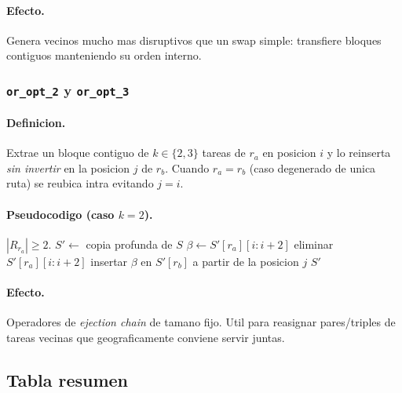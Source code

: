 \documentclass[11pt,a4paper]{article}
\newcommand{\op}[1]{\texttt{#1}}
\begin{document}
\paragraph{Efecto.} Genera vecinos mucho mas disruptivos que un swap
simple: transfiere bloques contiguos manteniendo su orden interno.

\subsubsection{\op{or\_opt\_2} y \op{or\_opt\_3}}

\paragraph{Definicion.} Extrae un bloque contiguo de $k\in\{2,3\}$
tareas de $r_a$ en posicion $i$ y lo reinserta \emph{sin invertir} en
la posicion $j$ de $r_b$. Cuando $r_a=r_b$ (caso degenerado de unica
ruta) se reubica intra evitando $j=i$.

\paragraph{Pseudocodigo (caso $k=2$).}
\begin{algorithm}[H]
\caption{\op{or\_opt\_2}($S, r_a, i, r_b, j$)}
\begin{algorithmic}[1]
\Require $|R_{r_a}|\ge 2$.
\State $S' \gets$ copia profunda de $S$
\State $\beta \gets S'[r_a][i:i{+}2]$
\State eliminar $S'[r_a][i:i{+}2]$
\State insertar $\beta$ en $S'[r_b]$ a partir de la posicion $j$
\State \Return $S'$
\end{algorithmic}
\end{algorithm}

\paragraph{Efecto.} Operadores de \emph{ejection chain} de tamano
fijo. Util para reasignar pares/triples de tareas vecinas que
geograficamente conviene servir juntas.

\subsection{Tabla resumen}
\end{document}
